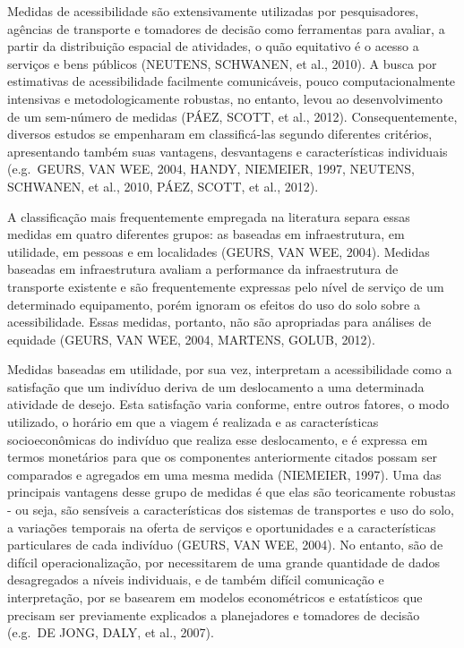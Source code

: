 \documentclass[msc,numbers]{coppe}
\begin{document}
  Medidas de acessibilidade são extensivamente utilizadas por pesquisadores, agências de transporte e tomadores de decisão como ferramentas para avaliar, a partir da distribuição espacial de atividades, o quão equitativo é o acesso a serviços e bens públicos (NEUTENS, SCHWANEN, et al., 2010). A busca por estimativas de acessibilidade facilmente comunicáveis, pouco computacionalmente intensivas e metodologicamente robustas, no entanto, levou ao desenvolvimento de um sem-número de medidas (PÁEZ, SCOTT, et al., 2012). Consequentemente, diversos estudos se empenharam em classificá-las segundo diferentes critérios, apresentando também suas vantagens, desvantagens e características individuais (e.g.~GEURS, VAN WEE, 2004, HANDY, NIEMEIER, 1997, NEUTENS, SCHWANEN, et al., 2010, PÁEZ, SCOTT, et al., 2012).

  A classificação mais frequentemente empregada na literatura separa essas medidas em quatro diferentes grupos: as baseadas em infraestrutura, em utilidade, em pessoas e em localidades (GEURS, VAN WEE, 2004). Medidas baseadas em infraestrutura avaliam a performance da infraestrutura de transporte existente e são frequentemente expressas pelo nível de serviço de um determinado equipamento, porém ignoram os efeitos do uso do solo sobre a acessibilidade. Essas medidas, portanto, não são apropriadas para análises de equidade (GEURS, VAN WEE, 2004, MARTENS, GOLUB, 2012).

  Medidas baseadas em utilidade, por sua vez, interpretam a acessibilidade como a satisfação que um indivíduo deriva de um deslocamento a uma determinada atividade de desejo. Esta satisfação varia conforme, entre outros fatores, o modo utilizado, o horário em que a viagem é realizada e as características socioeconômicas do indivíduo que realiza esse deslocamento, e é expressa em termos monetários para que os componentes anteriormente citados possam ser comparados e agregados em uma mesma medida (NIEMEIER, 1997). Uma das principais vantagens desse grupo de medidas é que elas são teoricamente robustas - ou seja, são sensíveis a características dos sistemas de transportes e uso do solo, a variações temporais na oferta de serviços e oportunidades e a características particulares de cada indivíduo (GEURS, VAN WEE, 2004). No entanto, são de difícil operacionalização, por necessitarem de uma grande quantidade de dados desagregados a níveis individuais, e de também difícil comunicação e interpretação, por se basearem em modelos econométricos e estatísticos que precisam ser previamente explicados a planejadores e tomadores de decisão (e.g.~DE JONG, DALY, et al., 2007).
\end{document}
